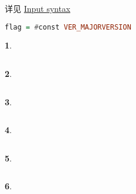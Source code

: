 \documentclass[UTF8]{ctexart}
\theoremstyle{sybs}
\newtheorem{syb}{}
\begin{document}
详见
\href{https://downloads.haskell.org/ghc/latest/docs/users_guide/utils.html#input-syntax}{Input syntax}

\begin{lstlisting}[language=Haskell]
  flag = #const VER_MAJORVERSION
\end{lstlisting}

\begin{syb}
\end{syb}


\begin{lstlisting}[language=Haskell]

\end{lstlisting}

\begin{syb}
\end{syb}



\begin{lstlisting}[language=Haskell]

\end{lstlisting}

\begin{syb}
\end{syb}



\begin{lstlisting}[language=Haskell]

\end{lstlisting}

\begin{syb}
\end{syb}



\begin{lstlisting}[language=Haskell]

\end{lstlisting}

\begin{syb}
\end{syb}



\begin{lstlisting}[language=Haskell]

\end{lstlisting}

\begin{syb}
\end{syb}
\end{document}
